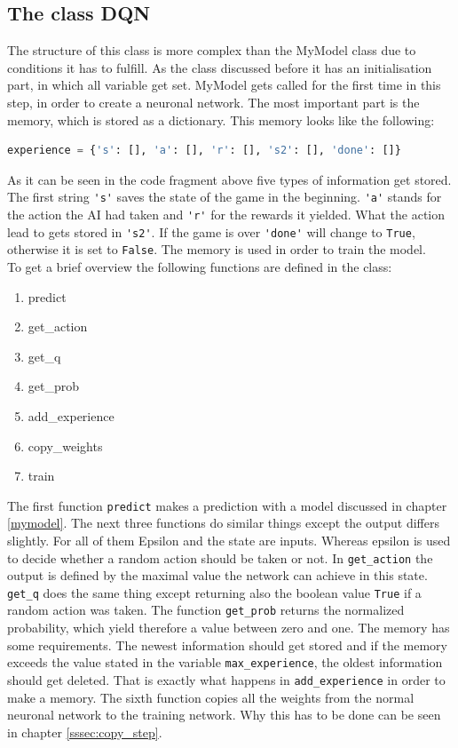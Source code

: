 \documentclass[12pt]{article}
\begin{document}
\subsection{The class DQN}
The structure of this class is more complex than the MyModel class due to conditions it has to fulfill. As the class discussed before it has an initialisation part, in which all variable get set. MyModel gets called for the first time in this step, in order to create a neuronal network. The most important part is the memory, which is stored as a dictionary. This memory looks like the following:
\begin{lstlisting}[language=Python, caption = Example - The memory of the neuronal network]
experience = {'s': [], 'a': [], 'r': [], 's2': [], 'done': []}
\end{lstlisting}
As it can be seen in the code fragment above five types of information get stored. The first string \lstinline{'s'} saves the state of the game in the beginning. \lstinline{'a'} stands for the action the AI had taken and \lstinline{'r'} for the rewards it yielded. What the action lead to gets stored in \lstinline{'s2'}. If the game is over \lstinline{'done'} will change to \lstinline{True}, otherwise it is set to \lstinline{False}. The memory is used in order to train the model.\\ To get a brief overview the following functions are defined in the class:
\begin{enumerate}
    \item predict
    \item get\_action
    \item get\_q
    \item get\_prob
    \item add\_experience
    \item copy\_weights
    \item train
\end{enumerate}
The first function \lstinline{predict} makes a prediction with a model discussed in chapter \ref{mymodel}. The next three functions do similar things except the output differs slightly. For all of them  Epsilon and the state are inputs. Whereas epsilon is used to decide whether a random action should be taken or not. In \lstinline{get_action} the output is defined by the maximal value the network can achieve in this state.  \lstinline{get_q} does the same thing except returning also the boolean value \lstinline{True} if a random action was taken. The function \lstinline{get_prob}  returns the normalized probability, which yield therefore a value between zero and one. The memory has some requirements. The newest information should get stored and if the memory exceeds the value stated in the variable \lstinline{max_experience}, the oldest information should get deleted. That is exactly what happens in \lstinline{add_experience} in order to make a memory. The sixth function copies all the weights from the normal neuronal network to the training network. Why this has to be done can be seen in chapter \ref{sssec:copy_step}.\\
\end{document}
